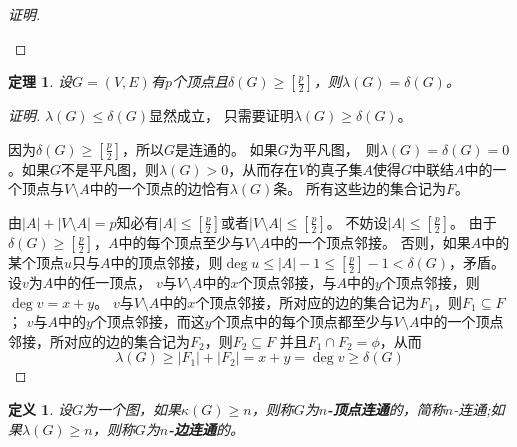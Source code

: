 \documentclass{article}
\newtheorem{Def}{定义}
\newtheorem{Thm}{定理}
\begin{document}
\begin{CJK*}{UTF8}{gbsn}
\begin{proof}[证明]
\begin{center}
\end{center}

  \end{proof}
    \begin{Thm}
    设$G=(V,E)$有$p$个顶点且$\delta(G) \geq [ \frac{p}{2} ]$，则$\lambda(G) = \delta(G)$。
  \end{Thm}
  \begin{proof}[证明]
     $\lambda(G) \leq \delta(G)$显然成立， 只需要证明$\lambda(G) \geq \delta(G)$。

     

    因为$\delta(G) \geq [\frac{p}{2}]$，所以$G$是连通的。 如果$G$为平凡图，　则$\lambda (G) = \delta(G) = 0$。如果$G$不是平凡图，则$\lambda(G) > 0$，从而存在$V$的真子集$A$使得$G$中联结$A$中的一个顶点与$V\setminus A$中的一个顶点的边恰有$\lambda(G)$条。 所有这些边的集合记为$F$。

   由$|A| + |V\setminus A| = p$知必有$|A| \leq [\frac{p}{2}]$或者$|V\setminus A| \leq [\frac{p}{2}]$。 不妨设$|A| \leq [\frac{p}{2}]$。  由于$\delta(G) \geq [\frac{p}{2}]$，$A$中的每个顶点至少与$V\setminus A$中的一个顶点邻接。 否则，如果$A$中的某个顶点$u$只与$A$中的顶点邻接，则$\deg u \leq |A|-1 \leq [\frac{p}{2}] - 1 < \delta(G)$，矛盾。 
    设$v$为$A$中的任一顶点， $v$与$V\setminus A$中的$x$个顶点邻接，与$A$中的$y$个顶点邻接，则$\deg v = x + y$。  $v$与$V\setminus A$中的$x$个顶点邻接，所对应的边的集合记为$F_1$，则$F_1 \subseteq F$；
    $v$与$A$中的$y$个顶点邻接，而这$y$个顶点中的每个顶点都至少与$V\setminus A$中的一个顶点邻接，所对应的边的集合记为$F_2$，则$F_2 \subseteq F$ 并且$F_1 \cap F_2 = \phi$，从而
    \[\lambda(G) \geq |F_1| + |F_2| = x + y = \deg v \geq  \delta(G)\]
  \end{proof}

    \begin{Def}
    设$G$为一个图，如果$\kappa (G) \geq n$，则称$G$为{\bfseries $n$-顶点连通}的，简称$n$-连通;如果$\lambda (G) \geq n$，则称$G$为{\bfseries $n$-边连通}的。
  \end{Def}


\end{CJK*}
\end{document}
